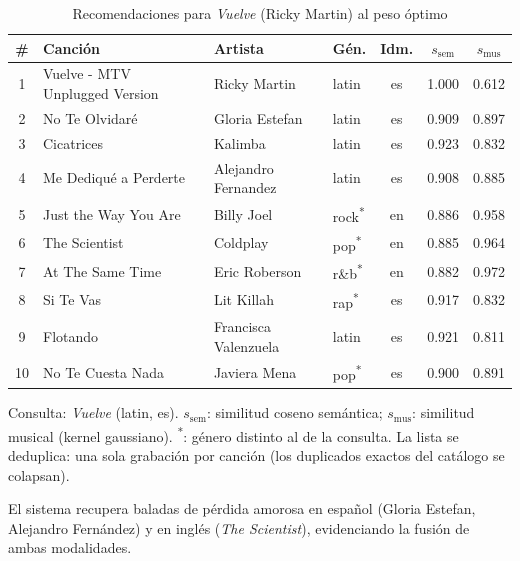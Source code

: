 \begin{table}[H]
  \centering
  \begin{threeparttable}
  \caption{Recomendaciones para \emph{Vuelve} (Ricky Martin) al peso óptimo}
  \label{tab:qual_case_vuelve}
  \small
  \begin{tabular}{clllccc}
    \toprule
    \# & Canción & Artista & Gén. & Idm. & $s_{\text{sem}}$ & $s_{\text{mus}}$ \\
    \midrule
    1 & Vuelve - MTV Unplugged Version & Ricky Martin & latin & es & 1.000 & 0.612 \\
    2 & No Te Olvidaré & Gloria Estefan & latin & es & 0.909 & 0.897 \\
    3 & Cicatrices & Kalimba & latin & es & 0.923 & 0.832 \\
    4 & Me Dediqué a Perderte & Alejandro Fernandez & latin & es & 0.908 & 0.885 \\
    5 & Just the Way You Are & Billy Joel & rock\textsuperscript{*} & en & 0.886 & 0.958 \\
    6 & The Scientist & Coldplay & pop\textsuperscript{*} & en & 0.885 & 0.964 \\
    7 & At The Same Time & Eric Roberson & r\&b\textsuperscript{*} & en & 0.882 & 0.972 \\
    8 & Si Te Vas & Lit Killah & rap\textsuperscript{*} & es & 0.917 & 0.832 \\
    9 & Flotando & Francisca Valenzuela & latin & es & 0.921 & 0.811 \\
    10 & No Te Cuesta Nada & Javiera Mena & pop\textsuperscript{*} & es & 0.900 & 0.891 \\
    \bottomrule
  \end{tabular}
  \begin{tablenotes}[flushleft]
    \small
    \item Consulta: \emph{Vuelve} (latin, es). $s_{\text{sem}}$: similitud coseno semántica; $s_{\text{mus}}$: similitud musical (kernel gaussiano). \textsuperscript{*}: género distinto al de la consulta. La lista se deduplica: una sola grabación por canción (los duplicados exactos del catálogo se colapsan).
    \item El sistema recupera baladas de pérdida amorosa en español (Gloria Estefan, Alejandro Fernández) y en inglés (\emph{The Scientist}), evidenciando la fusión de ambas modalidades.
  \end{tablenotes}
  \end{threeparttable}
\end{table}